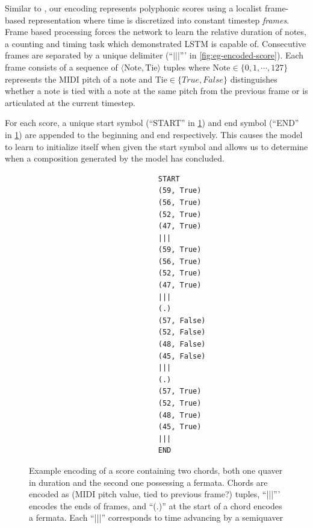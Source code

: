 Similar to \citep{todd1989connectionist}, our encoding represents polyphonic
scores using a localist frame-based representation where time is discretized
into constant timestep \emph{frames}. Frame based processing forces the network
to learn the relative duration of notes, a counting and timing task which
\citep{gers2002learning} demonstrated LSTM is capable of. Consecutive frames
are separated by a unique delimiter (``$|||$''' in
\vref{fig:eg-encoded-score}). Each frame consists of a sequence of $\langle
\text{Note}, \text{Tie} \rangle$ tuples where $\text{Note} \in
\{0,1,\cdots,127\}$ represents the MIDI pitch of a note and $\text{Tie} \in
\{True,False\}$ distinguishes whether a note is tied with a note at the same
pitch from the previous frame or is articulated at the current timestep.

For each score, a unique start symbol (``START'' in
\cref{fig:eg-encoded-score}) and end symbol (``END'' in
\cref{fig:eg-encoded-score}) are appended to the beginning and end
respectively. This causes the model to learn to initialize itself when given
the start symbol and allows us to determine when a composition generated by the
model has concluded.

\begin{figure}[p]
  \centering
  \begin{verbatim}
                              START
                              (59, True)
                              (56, True)
                              (52, True)
                              (47, True)
                              |||
                              (59, True)
                              (56, True)
                              (52, True)
                              (47, True)
                              |||
                              (.)
                              (57, False)
                              (52, False)
                              (48, False)
                              (45, False)
                              |||
                              (.)
                              (57, True)
                              (52, True)
                              (48, True)
                              (45, True)
                              |||
                              END
  \end{verbatim}
  \caption{Example encoding of a score containing two chords, both one quaver
    in duration and the second one possessing a fermata. Chords are encoded as
    (MIDI pitch value, tied to previous frame?) tuples, ``|||''' encodes the ends
    of frames, and ``(.)'' at the start of a chord encodes a fermata. Each ``|||''
  corresponds to time advancing by a semiquaver}
  \label{fig:eg-encoded-score}
\end{figure}

